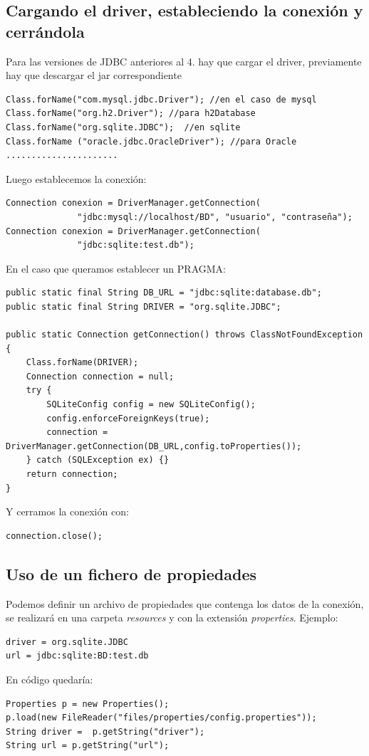 \documentclass[4paper]{article}
\begin{document}
\subsection{Cargando el driver, estableciendo la conexión y cerrándola}
Para las versiones de JDBC anteriores al 4. hay que cargar el driver, previamente hay que descargar el jar correspondiente
\begin{lstlisting}
Class.forName("com.mysql.jdbc.Driver"); //en el caso de mysql
Class.forName("org.h2.Driver"); //para h2Database
Class.forName("org.sqlite.JDBC");  //en sqlite
Class.forName ("oracle.jdbc.OracleDriver"); //para Oracle
...................... 
\end{lstlisting}
Luego establecemos la conexión:
\begin{verbatim}
Connection conexion = DriverManager.getConnection(
              "jdbc:mysql://localhost/BD", "usuario", "contraseña"); 
Connection conexion = DriverManager.getConnection( 
              "jdbc:sqlite:test.db");
\end{verbatim}

En el caso que queramos establecer un PRAGMA:
\begin{lstlisting}
public static final String DB_URL = "jdbc:sqlite:database.db";  
public static final String DRIVER = "org.sqlite.JDBC";  

public static Connection getConnection() throws ClassNotFoundException {  
    Class.forName(DRIVER);  
    Connection connection = null;  
    try {  
        SQLiteConfig config = new SQLiteConfig();  
        config.enforceForeignKeys(true);  
        connection = DriverManager.getConnection(DB_URL,config.toProperties());  
    } catch (SQLException ex) {}  
    return connection;  
}
\end{lstlisting}
Y cerramos la conexión con:
\begin{lstlisting}
connection.close();
\end{lstlisting}

\subsection{Uso de un fichero de propiedades}
Podemos definir un archivo de propiedades que contenga los datos de la conexión, se realizará en una carpeta \emph{resources} y con la extensión \emph{properties}. Ejemplo:
\begin{lstlisting}
driver = org.sqlite.JDBC
url = jdbc:sqlite:BD:test.db
\end{lstlisting}
En código quedaría:
\begin{lstlisting}
Properties p = new Properties();
p.load(new FileReader("files/properties/config.properties"));
String driver =  p.getString("driver");
String url = p.getString("url");
\end{lstlisting}
\end{document}
